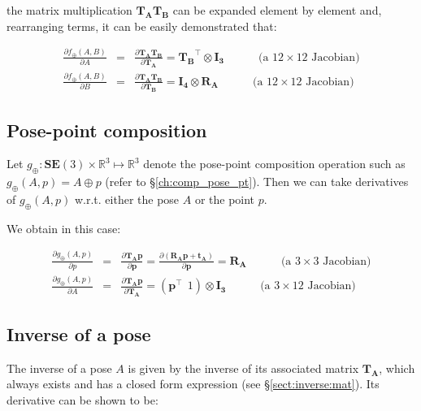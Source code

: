 \documentclass[a4paper,11pt]{report}
\begin{document}
\noindent the matrix multiplication $\mathbf{T_A}\mathbf{T_B}$ can be 
expanded element by element and, rearranging terms, it can be easily demonstrated that:

\begin{eqnarray}
\frac{\partial f_\oplus(A,B) }{\partial A } &=& 
\frac{\partial \mathbf{T_A}\mathbf{T_B} }{\partial \mathbf{T_A} } = \mathbf{T_B}^\top \otimes \mathbf{I_3}
\quad \quad \quad
\text{(a $12 \times 12$ Jacobian)}
\\
\frac{\partial f_\oplus(A,B) }{\partial B } &=& 
\frac{\partial \mathbf{T_A}\mathbf{T_B} }{\partial \mathbf{T_B} } = 
\mathbf{I_4} \otimes   \mathbf{R_A}
\quad \quad \quad
\text{(a $12 \times 12$ Jacobian)}
\end{eqnarray}


\subsection{Pose-point composition}

Let $g_\oplus: \mathbf{SE}(3) \times \mathbb{R}^3 \mapsto \mathbb{R}^3$ denote 
the pose-point composition operation
such as $g_\oplus(A,p) = A \oplus p$ 
(refer to \S\ref{ch:comp_pose_pt}).
Then we can take derivatives of $g_\oplus(A,p)$ w.r.t. either the pose $A$ or the point $p$. 

We obtain in this case:

\begin{eqnarray}
\label{eq:jac_dAp_p}
\frac{\partial g_\oplus(A,p) }{\partial p } &=&
\frac{\partial \mathbf{T_A}\mathbf{p} }{\partial \mathbf{p} } = 
\frac{\partial (\mathbf{R_A}\mathbf{p} + \mathbf{t_A})}{\partial \mathbf{p} } =
\mathbf{R_A}
\quad \quad \quad
\text{(a $3 \times 3$ Jacobian)}
\\
\label{eq:jac_dAp_A}
\frac{\partial g_\oplus(A,p) }{\partial A } &=& 
\frac{\partial \mathbf{T_A}\mathbf{p} }{\partial \mathbf{T_A} } =
\left( \mathbf{p}^\top ~~ 1 \right) \otimes \mathbf{I_3} 
\quad \quad \quad
\text{(a $3 \times 12$ Jacobian)}
\end{eqnarray}


\subsection{Inverse of a pose}

The inverse of a pose $A$ is given by the inverse of its associated matrix $\mathbf{T_A}$, 
which always exists and has a closed form expression (see \S\ref{sect:inverse:mat}).
Its derivative can be shown to be:
\end{document}
